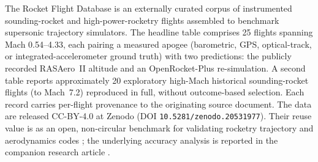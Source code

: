 The Rocket Flight Database is an externally curated corpus of instrumented
sounding-rocket and high-power-rocketry flights assembled to benchmark
supersonic trajectory simulators. The headline table comprises 25 flights
spanning Mach 0.54--4.33, each pairing a measured apogee (barometric, GPS,
optical-track, or integrated-accelerometer ground truth) with two predictions:
the publicly recorded RASAero~II \cite{rogers2015} altitude and an OpenRocket-Plus
\cite{niskanen2009} re-simulation. A second table reports approximately 20
exploratory high-Mach historical sounding-rocket flights (to Mach~7.2) reproduced
in full, without outcome-based selection. Each record carries per-flight
provenance to the originating source document. The data are released CC-BY-4.0 at
Zenodo (DOI \texttt{10.5281/zenodo.20531977}). Their reuse value is as an open,
non-circular benchmark for validating rocketry trajectory and aerodynamics codes
\cite{rocketpy2021}; the underlying accuracy analysis is reported in the companion
research article \cite{yu2026jsr}.
